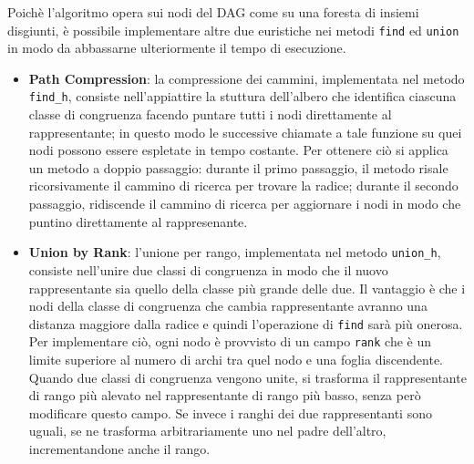 \documentclass[a4paper,11pt]{article}
\begin{document}
Poichè l'algoritmo opera sui nodi del DAG come su una foresta di insiemi 
disgiunti, è possibile implementare altre due euristiche nei metodi 
\texttt{find} ed \texttt{union} in modo da abbassarne ulteriormente 
il tempo di esecuzione.
\begin{itemize}
\item {\bf Path Compression}: la compressione dei cammini, implementata 
nel metodo \texttt{find\_h}, consiste nell'appiattire la stuttura 
dell'albero che identifica ciascuna classe di congruenza facendo puntare
tutti i nodi direttamente al rappresentante; in questo modo le successive 
chiamate a tale funzione su quei nodi possono essere espletate in 
tempo costante. Per ottenere ciò si applica un metodo a doppio 
passaggio: durante il primo passaggio, il metodo risale ricorsivamente 
il cammino di ricerca per trovare la radice; durante il secondo passaggio, 
ridiscende il cammino di ricerca per aggiornare i nodi in modo che 
puntino direttamente al rappresenante.
\item {\bf Union by Rank}: l'unione per rango, implementata nel metodo 
\texttt{union\_h}, consiste nell'unire due classi di congruenza in 
modo che il nuovo rappresentante sia quello della classe più grande 
delle due. Il vantaggio è che i nodi della classe di congruenza che 
cambia rappresentante avranno una distanza maggiore dalla radice e 
quindi l'operazione di \texttt{find} sarà più onerosa. Per implementare 
ciò, ogni nodo è provvisto di un campo \texttt{rank} che è un limite 
superiore al numero di archi tra quel nodo e una foglia discendente.
Quando due classi di congruenza vengono unite, si trasforma il 
rappresentante di rango più alevato nel rappresentante di rango più basso, 
senza però modificare questo campo. Se invece i ranghi dei due 
rappresentanti sono uguali, se ne trasforma arbitrariamente uno nel 
padre dell'altro, incrementandone anche il rango.
\end{itemize}

\end{document}
